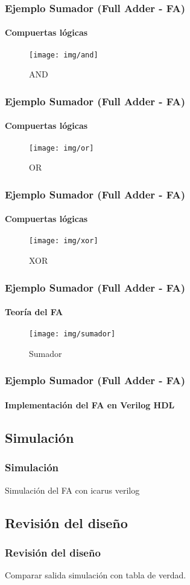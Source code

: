 \documentclass{beamer}
\begin{document}
\begin{frame}
  \frametitle{Ejemplo Sumador (Full Adder - FA)}
  \framesubtitle{Compuertas lógicas}
  \begin{figure}
    \texttt{[image: img/and]}
    \caption{AND}
  \end{figure}
\end{frame}

\begin{frame}
  \frametitle{Ejemplo Sumador (Full Adder - FA)}
  \framesubtitle{Compuertas lógicas}
  \begin{figure}
    \texttt{[image: img/or]}
    \caption{OR}
  \end{figure}
\end{frame}

\begin{frame}
  \frametitle{Ejemplo Sumador (Full Adder - FA)}
  \framesubtitle{Compuertas lógicas}
  \begin{figure}
    \texttt{[image: img/xor]}
    \caption{XOR}
  \end{figure}
\end{frame}

\begin{frame}
  \frametitle{Ejemplo Sumador (Full Adder - FA)}
  \framesubtitle{Teoría del FA}
  \begin{figure}
    \texttt{[image: img/sumador]}
    \caption{Sumador}
  \end{figure}
\end{frame}

\begin{frame}
  \frametitle{Ejemplo Sumador (Full Adder - FA)}
  \framesubtitle{Implementación del FA en Verilog HDL}
\end{frame}

\subsection{Simulación}

\begin{frame}
  \frametitle{Simulación}
  Simulación del FA con icarus verilog
\end{frame}

\subsection{Revisión del diseño}

\begin{frame}
  \frametitle{Revisión del diseño}
  Comparar salida simulación con tabla de verdad.
\end{frame}
\end{document}
